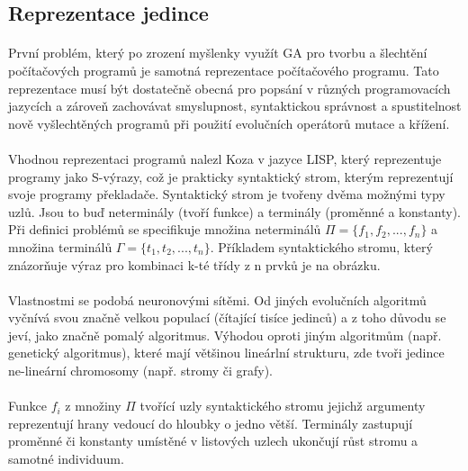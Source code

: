 \documentclass[bc,male,java,dept460]{diploma}		%
\begin{document}
\subsection{Reprezentace jedince}
\paragraph*{}
První problém, který po zrození myšlenky využít GA pro tvorbu a šlechtění počítačových programů je samotná reprezentace počítačového programu. Tato reprezentace musí být dostatečně obecná pro popsání v různých programovacích jazycích a zároveň zachovávat smyslupnost, syntaktickou správnost a spustitelnost nově vyšlechtěných programů při použití evolučních operátorů mutace a křížení.

\paragraph*{}
Vhodnou reprezentaci programů nalezl Koza v jazyce LISP, který reprezentuje programy jako S-výrazy, což je prakticky syntaktický strom, kterým reprezentují svoje programy překladače. Syntaktický strom je tvořeny dvěma možnými typy uzlů. Jsou to buď neterminály (tvoří funkce) a terminály (proměnné a konstanty). Při definici problémů se specifikuje množina neterminálů $\Pi=\{f_1,f_2,...,f_n\}$ a množina terminálů $\Gamma=\{t_1,t_2,...,t_n\}$. Příkladem syntaktického stromu, který znázorňuje výraz pro kombinaci k-té třídy z n prvků je na obrázku.

\paragraph*{}
Vlastnostmi se podobá neuronovými sítěmi. Od jiných evolučních algoritmů vyčnívá svou značně velkou populací (čítající tisíce jedinců) a z toho důvodu se jeví, jako značně pomalý algoritmus. Výhodou oproti jiným algoritmům (např. genetický algoritmus), které mají většinou lineárlní strukturu, zde tvoři jedince ne-lineární chromosomy (např. stromy či grafy).

\paragraph*{}
Funkce $f_i$ z množiny $\Pi$ tvořící uzly syntaktického stromu jejichž argumenty reprezentují hrany vedoucí do hloubky o jedno větší. Terminály zastupují proměnné či konstanty umístěné v listových uzlech ukončují růst stromu a samotné individuum.
\end{document}
